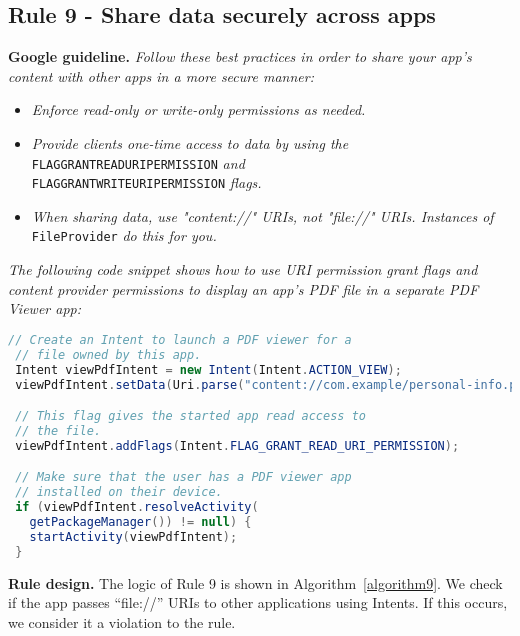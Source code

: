 \subsection{Rule 9 - Share data securely across apps} 
\textbf{Google guideline.} \emph{Follow these best practices in order to share your app's content with other apps in a more secure manner:}
\begin{itemize}
	\item \textit{Enforce read-only or write-only permissions as needed.}
	\item \textit{Provide clients one-time access to data by using the} \texttt{FLAG\textunderscore GRANT\textunderscore READ\textunderscore URI\textunderscore PERMISSION} \textit{and} \\ \texttt{FLAG\textunderscore GRANT\textunderscore WRITE\textunderscore URI\textunderscore PERMISSION} \textit{flags.}
	\item \textit{When sharing data, use "content://" URIs, not "file://" URIs. Instances of} \texttt{FileProvider} \textit{do this for you.}
\end{itemize}
\emph{The following code snippet shows how to use URI permission grant flags and content provider permissions to display an app's PDF file in a separate PDF Viewer app:}
\begin{lstlisting}[language=Java, caption=Share data securely across apps, numbers=none]
 // Create an Intent to launch a PDF viewer for a
 // file owned by this app.
 Intent viewPdfIntent = new Intent(Intent.ACTION_VIEW);
 viewPdfIntent.setData(Uri.parse("content://com.example/personal-info.pdf"));

 // This flag gives the started app read access to
 // the file.
 viewPdfIntent.addFlags(Intent.FLAG_GRANT_READ_URI_PERMISSION);

 // Make sure that the user has a PDF viewer app
 // installed on their device.
 if (viewPdfIntent.resolveActivity(
   getPackageManager()) != null) {
   startActivity(viewPdfIntent);
 }

\end{lstlisting}

\textbf{Rule design.} The logic of Rule 9 is shown in Algorithm~\ref{algorithm9}. We check if the app passes ``file://'' URIs to other applications using Intents. If this occurs, we consider it a violation to the rule. 

